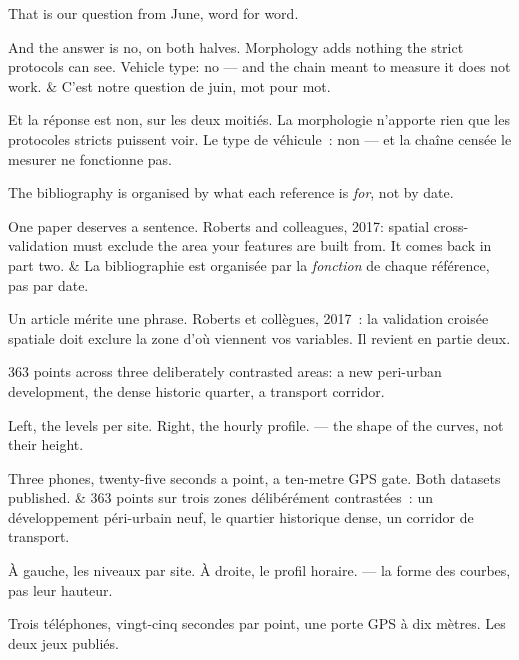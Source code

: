 \documentclass[10pt,a4paper]{article}
\begin{document}
\begin{say}
 That is our question from June, word for word.

And the answer is no, on both halves. Morphology adds nothing the strict
protocols can see. Vehicle type: no --- and the chain meant to measure it does not
work.
&
 C'est notre question de juin, mot pour mot.

Et la réponse est non, sur les deux moitiés. La morphologie n'apporte rien que
les protocoles stricts puissent voir. Le type de véhicule~: non --- et la chaîne
censée le mesurer ne fonctionne pas.
\end{say}

\begin{say}
The bibliography is organised by what each reference is \emph{for}, not by date.

One paper deserves a sentence. Roberts and colleagues, 2017: spatial
cross-validation must exclude the area your features are built from.
 It comes
back in part two.
&
La bibliographie est organisée par la \emph{fonction} de chaque référence, pas par
date.

Un article mérite une phrase. Roberts et collègues, 2017~: la validation croisée
spatiale doit exclure la zone d'où viennent vos variables.  Il revient en partie
deux.
\end{say}

\begin{say}
363 points across three deliberately contrasted areas: a new peri-urban
development, the dense historic quarter, a transport corridor.

Left, the levels per site. Right, the hourly profile.  --- the shape of the curves, not their height.

Three phones, twenty-five seconds a point, a ten-metre GPS gate. Both datasets
published.
&
363 points sur trois zones délibérément contrastées~: un développement
péri-urbain neuf, le quartier historique dense, un corridor de transport.

À gauche, les niveaux par site. À droite, le profil horaire.  --- la forme des courbes, pas leur
hauteur.

Trois téléphones, vingt-cinq secondes par point, une porte GPS à dix mètres. Les
deux jeux publiés.
\end{say}
\end{document}
